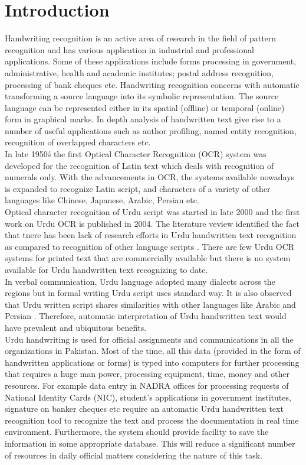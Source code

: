 \section{Introduction}
Handwriting recognition is an active area of research in the field of pattern recognition and has various application in industrial and professional applications. Some of these applications include forms processing in government, administrative, health and academic institutes; postal address recognition, processing of bank cheques etc. Handwriting recognition concerns with automatic transforming a source language into its symbolic representation. The source language can be represented either in its spatial (offline) or temporal (online) \cite{61} form in graphical marks. In depth analysis of handwritten text give rise to a number of useful applications such as author profiling, named entity recognition, recognition of overlapped characters etc.\\
In late 1950\'s the first Optical Character Recognition (OCR) system was developed for the recognition of Latin text \cite{62, 63} which deals with recognition of numerals only. With the advancements in OCR, the systems available nowadays is expanded to recognize Latin script, and characters of a variety of other languages like Chinese, Japanese, Arabic, Persian etc.\\
Optical character recognition of Urdu script was started in late 2000 \cite{7} and the first work on Urdu OCR is published in 2004. The literature veview identified the fact that tnere has been lack of research efforts in Urdu handwritten text recognition as compared to recognition of other language scripts \cite{5, 7, 27}. There are few Urdu OCR systems for printed text that are commercially available \cite{64, 65} but there is no system available for Urdu handwritten text recognizing to date.\\
In verbal communication, Urdu language adopted many dialects across the regions but in formal writing Urdu script uses standard way. It is also observed that Urdu written script shares similarities with other languages like Arabic and Persian \cite{21}. Therefore, automatic interpretation of Urdu handwritten text would have prevalent and ubiquitous benefits.\\
Urdu handwriting is used for official assignments and communications in all the organizations in Pakistan. Most of the time, all this data (provided in the form of handwritten applications or forms) is typed into computers for further processing that requires a huge man power, processing equipment, time, money and other resources. For example data entry in NADRA offices for processing requests of National Identity Cards (NIC), student’s applications in government institutes, signature on banker cheques etc require an automatic Urdu handwritten text recognition tool to recognize the text and process the documentation in real time environment. Furthermore, the system should provide facility to save the information in some appropriate database. This will reduce a significant number of resources in daily official matters considering the nature of this task.\\
